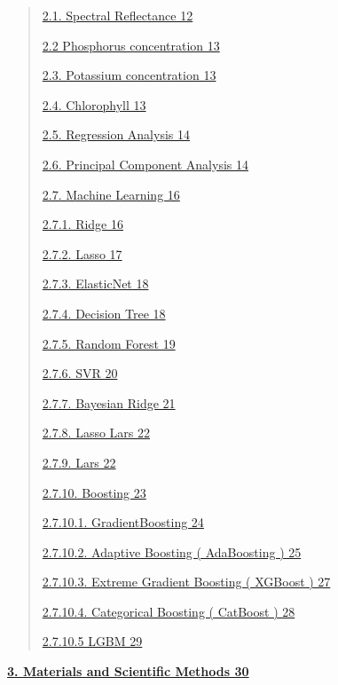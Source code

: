 \documentclass[
]{article}
\begin{document}
\begin{quote}
\protect\hyperlink{spectral-reflectance}{2.1. Spectral Reflectance 12}

\protect\hyperlink{po2.2-phosphorus-concentration}{2.2 Phosphorus
concentration 13}

\protect\hyperlink{potassium-concentration}{2.3. Potassium concentration
13}

\protect\hyperlink{chlorophyll}{2.4. Chlorophyll 13}

\protect\hyperlink{regression-analysis}{2.5. Regression Analysis 14}

\protect\hyperlink{principal-component-analysis}{2.6. Principal
Component Analysis 14}

\protect\hyperlink{machine-learning}{2.7. Machine Learning 16}

\protect\hyperlink{ridge}{2.7.1. Ridge 16}

\protect\hyperlink{lasso}{2.7.2. Lasso 17}

\protect\hyperlink{elasticnet}{2.7.3. ElasticNet 18}

\protect\hyperlink{decision-tree}{2.7.4. Decision Tree 18}

\protect\hyperlink{random-forest}{2.7.5. Random Forest 19}

\protect\hyperlink{svr}{2.7.6. SVR 20}

\protect\hyperlink{bayesian-ridge}{2.7.7. Bayesian Ridge 21}

\protect\hyperlink{lasso-lars}{2.7.8. Lasso Lars 22}

\protect\hyperlink{lars}{2.7.9. Lars 22}

\protect\hyperlink{boosting}{2.7.10. Boosting 23}

\protect\hyperlink{gradientboosting}{2.7.10.1. GradientBoosting 24}

\protect\hyperlink{adaptive-boosting-adaboosting}{2.7.10.2. Adaptive
Boosting ( AdaBoosting ) 25}

\protect\hyperlink{extreme-gradient-boosting-xgboost}{2.7.10.3. Extreme
Gradient Boosting ( XGBoost ) 27}

\protect\hyperlink{categorical-boosting-catboost}{2.7.10.4. Categorical
Boosting ( CatBoost ) 28}

\protect\hyperlink{lgbm}{2.7.10.5 LGBM 29}
\end{quote}

\protect\hyperlink{materials-and-scientific-methods}{\textbf{3.
Materials and Scientific Methods 30}}
\end{document}
